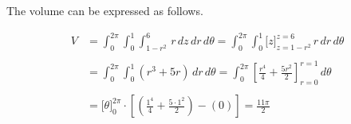 \documentclass{article}
\begin{document}
\hfill

\noindent The volume can be expressed as follows.

\begin{align*}
    V&=\int_0^{2\pi}\int_0^1\int_{1-r^2}^{6}\,r\,dz\,dr\,d\theta=\int_0^{2\pi}\int_0^1\big[z\big]_{z=1-r^2}^{z=6}\,r\,dr\,d\theta\\\\&=\int_0^{2\pi}\int_0^1\left(r^3+5r\right)\,dr\,d\theta=\int_0^{2\pi}\left[\frac{r^4}{4} + \frac{5r^2}{2}\right]_{r=0}^{r=1}\,d\theta\\\\&=\big[\theta\big]_0^{2\pi}\cdot\left[ \left(\frac{1^4}4 + \frac{5\cdot1^2}2\right)-\left(0\right)\right]=\boxed{\frac{11\pi}2}
\end{align*}
\end{document}
